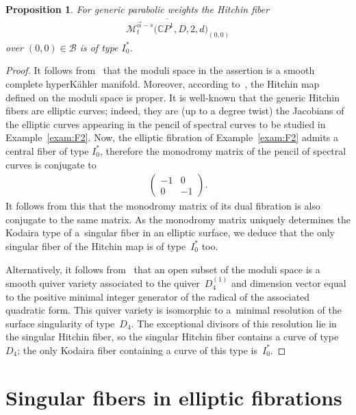 \documentclass[10pt,a4paper]{amsart}
\newcommand{\CP}[1]{\mathbb{C}P^{#1}} %
\newcommand{\Mod}{{\mathcal M}} %
\numberwithin{equation}{section}
\newtheorem{prop}{Proposition}[section]
\begin{document}
\begin{prop}\label{prop:Hitchin_fiber}
For generic parabolic weights the Hitchin fiber
\begin{gather*}
 \overline{\Mod_t^{\vec{\alpha}-s} \big(\CP1, D, 2, d\big)}_{(0,0)}
\end{gather*}
over $(0,0) \in \mathcal{B}$ is of type $I_0^*$.
\end{prop}

\begin{proof}It follows from~\cite[Theorem~0.2]{BB} that the moduli space in the assertion is a smooth complete hyperK\"ahler manifold.
Moreover, according to~\cite[Lemma~1]{Sz_PW}, the Hitchin map defined on the moduli space is proper.
It is well-known that the generic Hitchin fibers are elliptic curves; indeed, they are (up to a degree twist) the Jacobians of the elliptic curves
appearing in the pencil of spectral curves to be studied in Example~\ref{exam:F2}.
Now, the elliptic fibration of Example~\ref{exam:F2} admits a central fiber of type $I_0^*$, therefore the monodromy matrix
of the pencil of spectral curves is conjugate to
\begin{gather*}
 \begin{pmatrix}
 -1 & 0 \\
 0 & -1
 \end{pmatrix}.
\end{gather*}
It  follows from this that the monodromy matrix of its dual fibration is also conjugate to the same matrix. As the monodromy matrix uniquely determines the Kodaira type of a~singular fiber in an elliptic surface, we deduce that the only singular fiber of the Hitchin map is of type~$I_0^*$ too.

Alternatively, it follows from~\cite{CB} that an open subset of the moduli space is a smooth quiver variety associated to the quiver~$D_4^{(1)}$ and
dimension vector equal to the positive minimal integer generator of the radical of the associated quadratic form.
This quiver variety is isomorphic to a~minimal resolution of the surface singularity of type~$D_4$.
The exceptional divisors of this resolution lie in the singular Hitchin fiber, so the singular Hitchin fiber contains a curve of type~$D_4$;
the only Kodaira fiber containing a curve of this type is~$I_0^*$.
\end{proof}

\section{Singular fibers in elliptic fibrations} \label{sec:elliptic}
\end{document}
